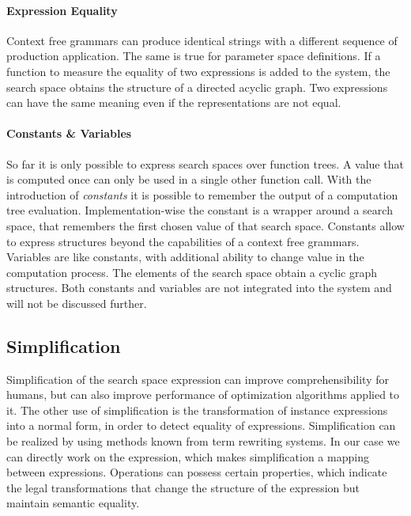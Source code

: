 \documentclass[english]{article}
\begin{document}
\paragraph{Expression Equality}
Context free grammars can produce identical strings with a different sequence of production application. The same is true for parameter space definitions.
If a function to measure the equality of two expressions is added to the system, the search space obtains the structure of a directed acyclic graph.
Two expressions can have the same meaning even if the representations are not equal.

\paragraph{Constants \& Variables}
So far it is only possible to express search spaces over function trees.
A value that is computed once can only be used in a single other function call. With the introduction of \textit{constants} it is possible to remember the output of a computation tree evaluation. Implementation-wise the constant is a wrapper around a search space, that remembers the first chosen value of that search space. Constants allow to express structures beyond the capabilities of a context free grammars. Variables are like constants, with additional ability to change value in the computation process. The elements of the search space obtain a cyclic graph structures. Both constants and variables are not integrated into the system and will not be discussed further.

\subsection{Simplification}
Simplification of the search space expression can improve comprehensibility for humans, but can also improve performance of optimization algorithms applied to it. The other use of simplification is the transformation of instance expressions into a normal form, in order to detect equality of expressions.
Simplification can be realized by using methods known from term rewriting systems. In our case we can directly work on the expression, which makes simplification a mapping between expressions.
Operations can possess certain properties, which indicate the legal transformations that change the structure of the expression but maintain semantic equality.
\end{document}
